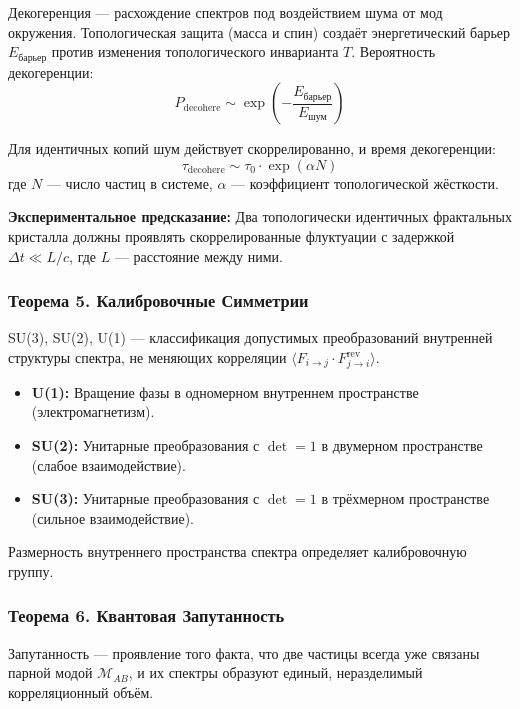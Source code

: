 \documentclass[12pt,a4paper]{article}
\begin{document}
Декогеренция --- расхождение спектров под воздействием шума от мод окружения. Топологическая защита (масса и спин) создаёт энергетический барьер $E_{\text{барьер}}$ против изменения топологического инварианта $T$. Вероятность декогеренции:
\begin{equation}
    P_{\text{decohere}} \sim \exp\left(-\frac{E_{\text{барьер}}}{E_{\text{шум}}}\right)
\end{equation}

Для идентичных копий шум действует скоррелированно, и время декогеренции:
\begin{equation}
    \tau_{\text{decohere}} \sim \tau_0 \cdot \exp(\alpha N)
\end{equation}
где $N$ --- число частиц в системе, $\alpha$ --- коэффициент топологической жёсткости.

\textbf{Экспериментальное предсказание:} Два топологически идентичных фрактальных кристалла должны проявлять скоррелированные флуктуации с задержкой $\Delta t \ll L/c$, где $L$ --- расстояние между ними.

\subsubsection{Теорема 5. Калибровочные Симметрии}
SU(3), SU(2), U(1) --- классификация допустимых преобразований внутренней структуры спектра, не меняющих корреляции $\langle F_{i \to j} \cdot F_{j \to i}^{\text{rev}} \rangle$.

\begin{itemize}
    \item \textbf{U(1):} Вращение фазы в одномерном внутреннем пространстве (электромагнетизм).
    \item \textbf{SU(2):} Унитарные преобразования с $\det = 1$ в двумерном пространстве (слабое взаимодействие).
    \item \textbf{SU(3):} Унитарные преобразования с $\det = 1$ в трёхмерном пространстве (сильное взаимодействие).
\end{itemize}

Размерность внутреннего пространства спектра определяет калибровочную группу.

\subsubsection{Теорема 6. Квантовая Запутанность}
Запутанность --- проявление того факта, что две частицы всегда уже связаны парной модой $\mathcal{M}_{AB}$, и их спектры образуют единый, неразделимый корреляционный объём.
\end{document}
